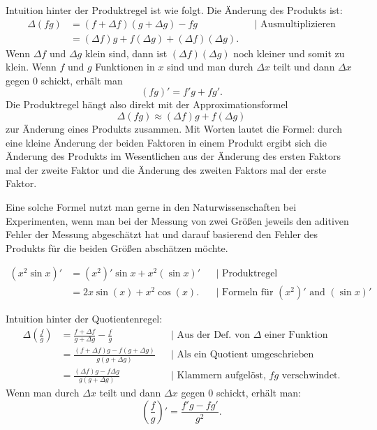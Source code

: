 \begin{bem}
	Intuition hinter der Produktregel ist wie folgt. Die Änderung des Produkts ist: 
	\begin{align*}
		\Delta (f g) & = (f+\Delta f) ( g + \Delta g) - f g & & |\text{ Ausmultiplizieren} 
		 \\ & = (\Delta f) g  + f (\Delta g ) + (\Delta f) (\Delta g).
	\end{align*}
	Wenn $\Delta f$ und $\Delta g$ klein sind, dann ist $(\Delta f) (\Delta g)$ noch kleiner und somit zu klein. Wenn $f$ und $g$ Funktionen in $x$ sind und man durch $\Delta x$ teilt und dann $\Delta x$ gegen $0$ schickt, erhält man 
	\[
		(f g)' = f' g + f g'.
	\]
	Die Produktregel hängt also direkt mit der Approximationsformel
	\[
		\Delta (f g) \approx(\Delta f) g + f (\Delta g)
	\]
	zur Änderung eines Produkts zusammen. Mit Worten lautet die Formel: durch eine kleine Änderung der beiden Faktoren in einem Produkt  ergibt sich die Änderung des Produkts im Wesentlichen aus der Änderung des ersten Faktors mal der zweite Faktor und die Änderung des zweiten Faktors mal der erste Faktor. 
	
	Eine solche Formel nutzt man gerne in den Naturwissenschaften bei Experimenten, wenn man bei der Messung von zwei Größen jeweils den aditiven Fehler der Messung abgeschätzt hat und darauf basierend den Fehler des Produkts für die beiden Größen abschätzen möchte. 
\end{bem} 

\begin{bsp}[zu Produktregel] 
	\begin{align*}
		(x^2 \sin x)' & = (x^2)' \sin x + x^2 (\sin x)'  & & |\text{ Produktregel}
		\\ & = 2 x \sin(x)+ x^2 \cos(x). & & |\text{ Formeln für $(x^2)'$ and $(\sin x)'$} 
	\end{align*}
\end{bsp} 

\begin{bem} 
	Intuition hinter der Quotientenregel: 
	\begin{align*}
	\Delta \left( \frac{f}{g} \right) & = \frac{ f + \Delta f}{g + \Delta g} - \frac{f}{g}  & & |\text{ Aus der Def. von $\Delta$ einer Funktion} 
	\\ & = \frac{(f+ \Delta f) g - f (g + \Delta g) }{ g (g + \Delta g)} 
	& & |\text{ Als ein Quotient umgeschrieben}
	\\ & =  \frac{(\Delta f) g - f \Delta g }{g (g + \Delta g)} & & 
	|\text{ Klammern aufgelöst, $fg$ verschwindet.}
	\end{align*}
	Wenn man durch $\Delta x$ teilt und dann $\Delta x$ gegen $0$ schickt, erhält man: 
	\[
	\left( \frac{f}{g} \right)' = \frac{f' g - f g'}{g^2}. 
	\]
\end{bem} 


